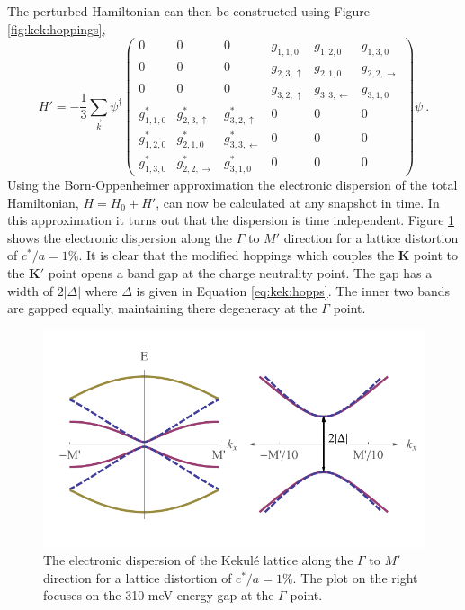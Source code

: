 The perturbed Hamiltonian can then be constructed using Figure \ref{fig:kek:hoppings}, 
\begin{equation*}
	H'=-\frac{1}{3} \sum_{\vec{k}} \psi^{\dagger} 
	\left(\begin{array}{cccccc}
		0           & 0                     & 0                    & g_{1,1,0}        & g_{1,2,0}          & g_{1,3,0} \\
		0           & 0                     & 0                    & g_{2,3,\uparrow} & g_{2,1,0}          & g_{2,2,\rightarrow} \\
		0           & 0                     & 0                    & g_{3,2,\uparrow} & g_{3,3,\leftarrow} & g_{3,1,0} \\
		g_{1,1,0}^* & g_{2,3,\uparrow}^*    & g_{3,2,\uparrow}^*   & 0            & 0              & 0 \\
		g_{1,2,0}^* & g_{2,1,0}^*           & g_{3,3,\leftarrow}^* & 0            & 0              & 0 \\
		g_{1,3,0}^* & g_{2,2,\rightarrow}^* & g_{3,1,0}^*          & 0            & 0              & 0 
	\end{array}\right)
	\psi \ .
\end{equation*}
Using the Born-Oppenheimer approximation the electronic dispersion of the total Hamiltonian, $H=H_0+H'$, can now be calculated at any snapshot in time.
In this approximation it turns out that the dispersion is time independent.
Figure \ref{fig:kek:gapped} shows the electronic dispersion along the $\Gamma$ to $M'$ direction for a lattice distortion of $c^*/a=1\%$.
It is clear that the modified hoppings which couples the $\bm{K}$ point to the $\bm{K'}$ point opens a band gap at the charge neutrality point.
The gap has a width of $2 |\Delta|$ where $\Delta$ is given in Equation \ref{eq:kek:hopps}.
The inner two bands are gapped equally, maintaining there degeneracy at the $\Gamma$ point.

\begin{figure}
	\begin{center}
	\includegraphics{Figs_Kekule/gapped.pdf}
	\end{center}
	\caption[Gapped electronic dispersion of the Kekul\'e lattice]{\label{fig:kek:gapped}
		The electronic dispersion of the Kekul\'e lattice along the $\Gamma$ to $M'$ direction for a lattice distortion of $c^*/a=1\%$.
		The plot on the right focuses on the 310 meV energy gap at the $\Gamma$ point.
	}
\end{figure}

